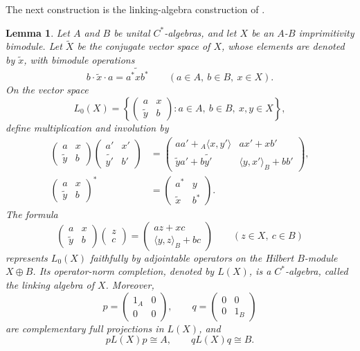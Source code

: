 \documentclass{book}
\newtheorem{lemma}[definition]{Lemma}
\def\cstar{\(C^*\)-algebra}
\def\cstars{\(C^*\)-algebras}
\begin{document}
The next construction is the linking-algebra construction of
\cite[Theorem~1.1, pp.~350--351]{BrownGreenRieffel1977}.
\begin{lemma}\label{lemma:LinkingAlgebraConstruction}
  Let \(A\) and \(B\) be unital \cstars, and let \(X\) be an
  \(A\)-\(B\) imprimitivity bimodule. Let
  \(\widetilde X\) be the conjugate vector space of \(X\), whose elements are
  denoted by \(\widetilde x\), with bimodule operations
  \[
    b\cdot\widetilde x\cdot a
    =\widetilde{a^*xb^*}
    \qquad(a\in A,\ b\in B,\ x\in X).
  \]
  On the vector space
  \[
    L_0(X)=
    \left\{
      \begin{pmatrix}
        a&x\\
        \widetilde y&b
      \end{pmatrix}
      :a\in A,\ b\in B,\ x,y\in X
    \right\},
  \]
  define multiplication and involution by
  \begin{align*}
    \begin{pmatrix}a&x\\ \widetilde y&b\end{pmatrix}
    \begin{pmatrix}a'&x'\\ \widetilde {y'}&b'\end{pmatrix}
    &=\begin{pmatrix}
      aa'+{}_A\langle x,y'\rangle&ax'+xb'\\
      \widetilde y a'+b\widetilde {y'}&\langle y,x'\rangle_B+bb'
    \end{pmatrix},\\
    \begin{pmatrix}a&x\\ \widetilde y&b\end{pmatrix}^*
    &=\begin{pmatrix}a^*&y\\ \widetilde x&b^*\end{pmatrix}.
  \end{align*}
  The formula
  \[
    \begin{pmatrix}a&x\\ \widetilde y&b\end{pmatrix}
    \begin{pmatrix}z\\ c\end{pmatrix}
    =
    \begin{pmatrix}az+xc\\ \langle y,z\rangle_B+bc\end{pmatrix}
    \qquad(z\in X,\ c\in B)
  \]
  represents \(L_0(X)\) faithfully by adjointable operators on the Hilbert
  \(B\)-module \(X\oplus B\). Its operator-norm completion, denoted by
  \(L(X)\), is a \cstar, called the \textnormal{linking algebra} of \(X\).
  Moreover,
  \[
    p=\begin{pmatrix}1_A&0\\0&0\end{pmatrix}, 
    \qquad
    q=\begin{pmatrix}0&0\\0&1_B\end{pmatrix}
  \]
  are complementary full projections in \(L(X)\), and
  \[
    pL(X)p\cong A,
    \qquad
    qL(X)q\cong B.
  \]
\end{lemma}
\end{document}
